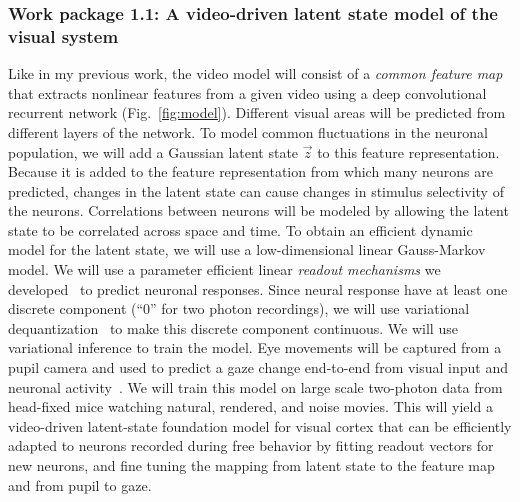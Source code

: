 \documentclass[B2,COG]{ercgrant}
\begin{document}
\subsubsection{Work package 1.1: A video-driven latent state model of the visual system\hfill{}}
Like in my previous work, the video model will consist of a \textit{common feature map} that extracts nonlinear features from a given video using a deep convolutional recurrent network (Fig.~\ref{fig:model}).
Different visual areas will be predicted  from different layers of the network.
To model common fluctuations in the neuronal population, we will add a Gaussian latent state $\vec{z}$ to this feature representation.
Because it is added to the feature representation from which many neurons are predicted, changes in the latent state can cause changes in stimulus selectivity of the neurons.
Correlations between neurons will be modeled by allowing the latent state to be correlated across space and time. 
To obtain an efficient dynamic model for the latent state, we will use a low-dimensional linear Gauss-Markov model.
We will use a parameter efficient linear \textit{readout mechanisms} we developed~\parencite{Lurz2020-ua} to predict neuronal responses.
Since neural response have at least one discrete component (``0'' for two photon recordings), we will use variational dequantization~\parencite{Hoogeboom2021-zs} to make this discrete component continuous.
We will use variational inference to train the model. 
Eye movements will be captured from a pupil camera and used to predict a gaze change end-to-end from visual input and neuronal activity~\parencite[Fig.~\ref{fig:videomodel}]{Sinz2018-sk}.
We will train this model on large scale two-photon data from head-fixed mice watching natural, rendered, and noise movies.
This  will yield a video-driven latent-state foundation model for visual cortex that can be efficiently adapted to neurons recorded during free behavior by fitting readout vectors for new neurons, and fine tuning the mapping from latent state to the feature map and from pupil to gaze.

\end{document}
